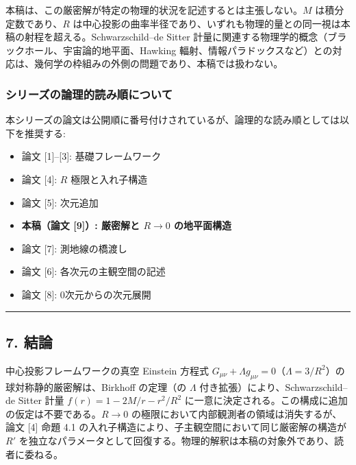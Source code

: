 \documentclass[a4paper,11pt]{ltjsarticle}
\theoremstyle{definition}
\providecommand{\tightlist}{\setlength{\itemsep}{0pt}\setlength{\parskip}{0pt}}
\begin{document}
本稿は、この厳密解が特定の物理的状況を記述するとは主張しない。\(M\)
は積分定数であり、\(R\)
は中心投影の曲率半径であり、いずれも物理的量との同一視は本稿の射程を超える。Schwarzschild--de
Sitter
計量に関連する物理学的概念（ブラックホール、宇宙論的地平面、Hawking
輻射、情報パラドックスなど）との対応は、幾何学の枠組みの外側の問題であり、本稿では扱わない。

\subsubsection{シリーズの論理的読み順について}\label{ux30b7ux30eaux30fcux30baux306eux8ad6ux7406ux7684ux8aadux307fux9806ux306bux3064ux3044ux3066}

本シリーズの論文は公開順に番号付けされているが、論理的な読み順としては以下を推奨する:

\begin{itemize}
\tightlist
\item
  論文 {[}1{]}--{[}3{]}: 基礎フレームワーク
\item
  論文 {[}4{]}: \(R\) 極限と入れ子構造
\item
  論文 {[}5{]}: 次元追加
\item
  \textbf{本稿（論文 {[}9{]}）: 厳密解と \(R \to 0\) の地平面構造}
\item
  論文 {[}7{]}: 測地線の橋渡し
\item
  論文 {[}6{]}: 各次元の主観空間の記述
\item
  論文 {[}8{]}: 0次元からの次元展開
\end{itemize}

\begin{center}\rule{0.5\linewidth}{0.5pt}\end{center}

\subsection{7. 結論}\label{ux7d50ux8ad6}

中心投影フレームワークの真空 Einstein 方程式
\(G_{\mu\nu} + \Lambda g_{\mu\nu} = 0\)（\(\Lambda = 3/R^2\)）の球対称静的厳密解は、Birkhoff
の定理（の \(\Lambda\) 付き拡張）により、Schwarzschild--de Sitter 計量
\(f(r) = 1 - 2M/r - r^2/R^2\)
に一意に決定される。この構成に追加の仮定は不要である。\(R \to 0\)
の極限において内部観測者の領域は消失するが、論文 {[}4{]} 命題 4.1
の入れ子構造により、子主観空間において同じ厳密解の構造が \(R'\)
を独立なパラメータとして回復する。物理的解釈は本稿の対象外であり、読者に委ねる。
\end{document}
